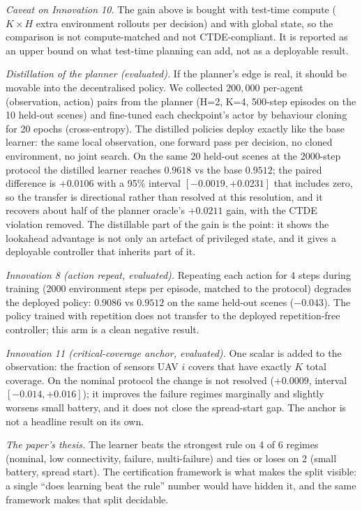 \documentclass[conference]{IEEEtran}
\begin{document}
\emph{Caveat on Innovation 10.}  The gain above is bought with
test-time compute ($K \times H$ extra environment rollouts per
decision) and with global state, so the comparison is not
compute-matched and not CTDE-compliant.  It is reported as an upper
bound on what test-time planning can add, not as a deployable result.

\emph{Distillation of the planner (evaluated).}  If the planner's
edge is real, it should be movable into the decentralised policy.  We
collected $200{,}000$ per-agent (observation, action) pairs from the
planner (H=2, K=4, 500-step episodes on the 10 held-out scenes) and
fine-tuned each checkpoint's actor by behaviour cloning for 20 epochs
(cross-entropy).  The distilled policies deploy exactly like the base
learner: the same local observation, one forward pass per decision, no
cloned environment, no joint search.  On the same 20 held-out scenes at
the 2000-step protocol the distilled learner reaches $0.9618$ vs the
base $0.9512$; the paired difference is $+0.0106$ with a 95\% interval
$[-0.0019, +0.0231]$ that includes zero, so the transfer is directional
rather than resolved at this resolution, and it recovers about half of
the planner oracle's $+0.0211$ gain, with the CTDE violation removed.
The distillable part of the gain is the point: it shows the lookahead
advantage is not only an artefact of privileged state, and it gives a
deployable controller that inherits part of it.

\emph{Innovation 8 (action repeat, evaluated).}  Repeating each action for
4 steps during training (2000 environment steps per episode, matched to the
protocol) degrades the deployed policy: $0.9086$ vs $0.9512$ on the same
held-out scenes ($-0.043$).  The policy trained with repetition does not
transfer to the deployed repetition-free controller; this arm is a clean
negative result.

\emph{Innovation 11 (critical-coverage anchor, evaluated).}  One scalar is
added to the observation: the fraction of sensors UAV $i$ covers that have
exactly $K$ total coverage.  On the nominal protocol the change is not
resolved ($+0.0009$, interval $[-0.014, +0.016]$); it improves the failure
regimes marginally and slightly worsens small battery, and it does not close
the spread-start gap.  The anchor is not a headline result on its own.

\emph{The paper's thesis.}  The learner beats the strongest rule
on 4 of 6 regimes (nominal, low connectivity, failure, multi-failure) and
ties or loses on 2 (small battery, spread start).  The certification
framework is what makes the split visible: a single ``does learning beat
the rule'' number would have hidden it, and the same framework makes that split decidable.
\end{document}
